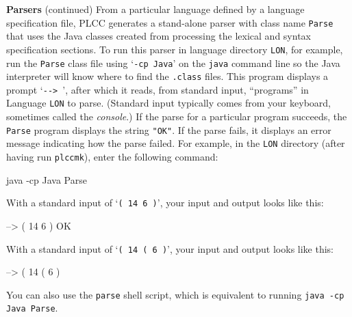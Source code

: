 \begin{minipage}[t]{\sw}
\slidenumber
\LARGE
{\bf Parsers} (continued)\exx
\Large
From a particular language defined by a language specification file,
PLCC generates a stand-alone parser with class name \verb'Parse'
that uses the Java classes created
from processing the lexical and syntax specification sections.
To run this parser in language directory \verb'LON', for example,
run the \verb'Parse' class file 
using `\verb'-cp Java'' on the \verb'java' command line
so the Java interpreter will know where
to find the \verb'.class' files.
This program displays a prompt `\verb'--> '',
after which it reads, from standard input,
``programs'' in Language \verb'LON' to parse.
(Standard input typically comes from your keyboard,
sometimes called the {\em console}.)
If the parse for a particular program succeeds,
the \verb'Parse' program displays the string \verb'"OK"'.
If the parse fails, it displays
an error message indicating how the parse failed.\exx
For example, in the \verb'LON' directory (after having run \verb'plccmk'),
enter the following command:
\begin{qv}
java -cp Java Parse
\end{qv}
With a standard input of `\verb'( 14 6 )'',
your input and output looks like this:
\begin{qv}
--> ( 14 6 )
OK
\end{qv}
With a standard input of `\verb'( 14 ( 6 )'',
your input and output looks like this:
\begin{qv}
--> ( 14 ( 6 )
\end{qv}
You can also use the \verb'parse' shell script,
which is equivalent to running \verb'java -cp Java Parse'.
\end{minipage}
\clearpage
